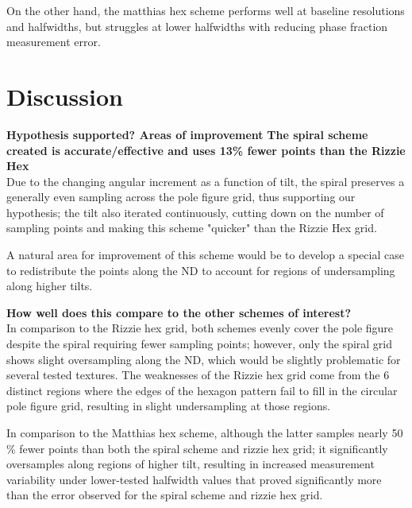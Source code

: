 \documentclass{article}
\begin{document}
On the other hand, the matthias hex scheme performs well at baseline resolutions and halfwidths, but struggles at lower halfwidths with reducing phase fraction measurement error.

\section{Discussion}
\textbf{Hypothesis supported? Areas of improvement}
\textbf{The spiral scheme created is accurate/effective and uses 13\% fewer points than the Rizzie Hex}\\

Due to the changing angular increment as a function of tilt, the spiral preserves a generally even sampling across the pole figure grid, thus supporting our hypothesis; the tilt also iterated continuously, cutting down on the number of sampling points and making this scheme "quicker" than the Rizzie Hex grid.


A natural area for improvement of this scheme would be to develop a special case to redistribute the points along the ND to account for regions of undersampling along higher tilts.

\textbf{How well does this compare to the other schemes of interest?}\\

In comparison to the Rizzie hex grid, both schemes evenly cover the pole figure despite the spiral requiring fewer sampling points; however, only the spiral grid shows slight oversampling along the ND, which would be slightly problematic for several tested textures. The weaknesses of the Rizzie hex grid come from the 6 distinct regions where the edges of the hexagon pattern fail to fill in the circular pole figure grid, resulting in slight undersampling at those regions.

In comparison to the Matthias hex scheme, although the latter samples nearly 50 \% fewer points than both the spiral scheme and rizzie hex grid; it significantly oversamples along regions of higher tilt, resulting in increased measurement variability under lower-tested halfwidth values that proved significantly more than the error observed for the spiral scheme and rizzie hex grid.
\end{document}
